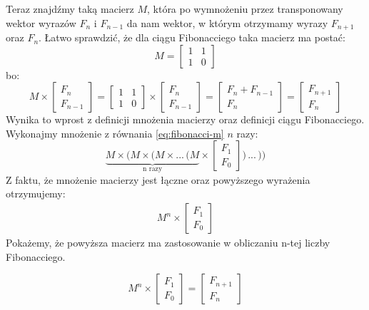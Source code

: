 Teraz znajdźmy taką macierz $M$, która po wymnożeniu przez transponowany wektor wyrazów $F_{n}$ i $F_{n - 1}$ da nam wektor, w którym otrzymamy wyrazy $F_{n + 1}$ oraz $F_{n}$. 
Łatwo sprawdzić, że dla ciągu Fibonacciego taka macierz ma postać:
\begin{equation*}
  M = \begin{bmatrix}1 & 1 \\ 1 & 0\end{bmatrix}
\end{equation*}
bo:
\begin{equation}
  \label{eq:fibonacci-m}
  M
  \times
  \begin{bmatrix}F_n \\ F_{n - 1}\end{bmatrix}
  =
  \begin{bmatrix}1 & 1 \\ 1 & 0\end{bmatrix}
  \times
  \begin{bmatrix}F_n \\ F_{n - 1}\end{bmatrix}
  =
  \begin{bmatrix}F_n + F_{n - 1} \\ F_{n}\end{bmatrix}
  =
  \begin{bmatrix}F_{n + 1} \\ F_{n}\end{bmatrix}
\end{equation}
Wynika to wprost z definicji mnożenia macierzy oraz definicji ciągu Fibonacciego.
Wykonajmy mnożenie z równania \ref{eq:fibonacci-m} $n$ razy:
\begin{equation*}
  \underbrace{M \times \bigg(M \times \bigg(M \times ...\,\bigg(M}_\text{n razy}
  \times
  \begin{bmatrix}F_1 \\ F_0\end{bmatrix}\bigg)\,...\,\bigg)\bigg)
\end{equation*}
Z faktu, że mnożenie macierzy jest łączne oraz powyższego wyrażenia otrzymujemy:
\begin{align*}
  M^n \times \begin{bmatrix}F_1 \\ F_0\end{bmatrix}
\end{align*}
Pokażemy, że powyższa macierz ma zastosowanie w obliczaniu n-tej liczby Fibonacciego.
\begin{lemma}
  \begin{equation*}
    M^{n} \times \begin{bmatrix}F_1 \\ F_0\end{bmatrix} = \begin{bmatrix}F_{n + 1} \\ F_{n}\end{bmatrix}
  \end{equation*}
\end{lemma}

